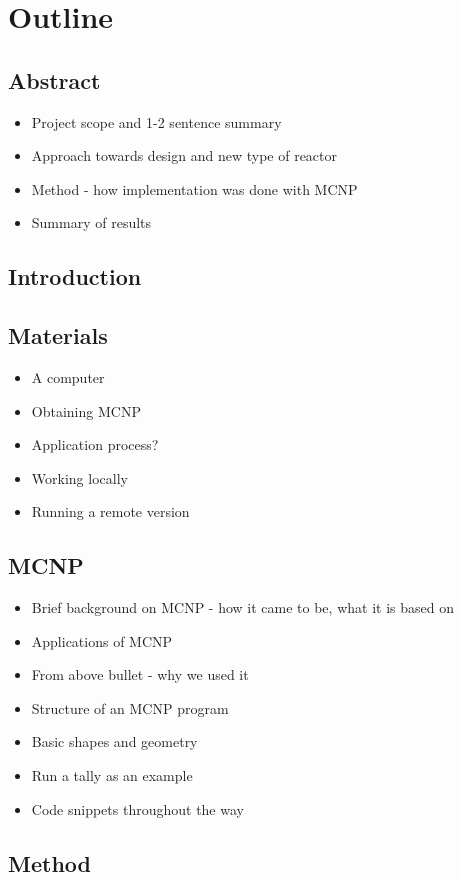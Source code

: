\documentclass[12pt,a4paper]{article}
\begin{document}
\section*{Outline}
\renewcommand{\thesubsection}{\arabic{subsection}}
\subsection{Abstract}
\begin{itemize}
	\item Project scope and 1-2 sentence summary
	\item Approach towards design and new type of reactor
	\item Method - how implementation was done with MCNP
	\item Summary of results
\end{itemize}
\subsection{Introduction}
\subsection{Materials}
\begin{itemize}
	\item A computer
	\item Obtaining MCNP
	\item Application process?
	\item Working locally
	\item Running a remote version
\end{itemize}
\subsection{MCNP}
\begin{itemize}
	\item Brief background on MCNP - how it came to be, what it is based on
	\item Applications of MCNP
	\item From above bullet - why we used it
	\item Structure of an MCNP program
	\item Basic shapes and geometry
	\item Run a tally as an example
	\item Code snippets throughout the way
\end{itemize}
\subsection{Method}
\end{document}
